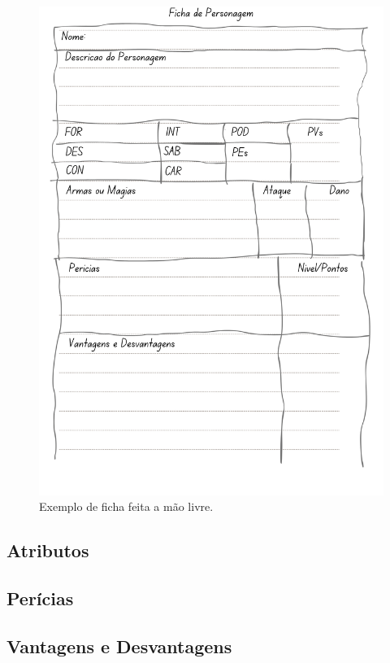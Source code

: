 \begin{figure}[htb]
	\centering
	\includegraphics[scale=0.5]{img/fichaManual.png}
	\caption{Exemplo de ficha feita a mão livre.}
	\label{fichaMaoLivre}
\end{figure}

\subsection{\label{subsecAtributos}Atributos}

\subsection{\label{subsecPericias}Perícias}
\subsection{\label{subsecVantagens}Vantagens e Desvantagens}
